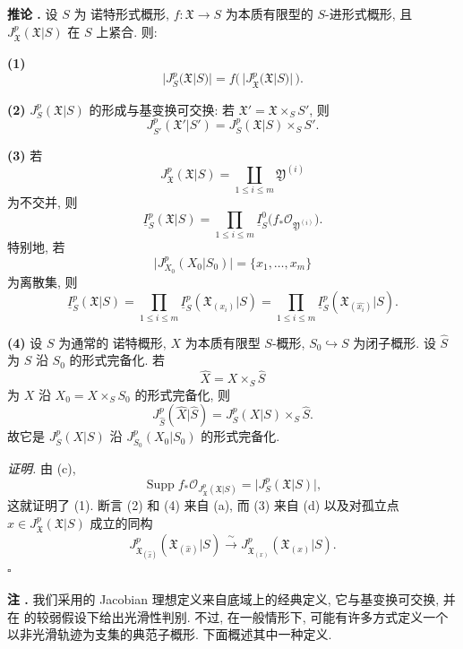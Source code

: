 \medskip
\noindent\textbf{推论 .}
设 $S$ 为 诺特形式概形, $f:\mathfrak X\longrightarrow S$ 为本质有限型的 $S$-进形式概形, 且 $J_{\mathfrak X}^p(\mathfrak X|S)$ 在 $S$ 上紧合. 则:

\smallskip
\noindent\textbf{(1)}
\[
\bigl|J_S^p(\mathfrak X|S)\bigr|
=f\bigl(\,|J_{\mathfrak X}^p(\mathfrak X|S)|\,\bigr).
\]


\smallskip
\noindent\textbf{(2)} $J_S^p(\mathfrak X|S)$ 的形成与基变换可交换: 若 $\mathfrak X'=\mathfrak X\times_SS'$, 则
\[
J_{S'}^p(\mathfrak X'|S')
=J_S^p(\mathfrak X|S)\times_SS'.
\]

\smallskip
\noindent\textbf{(3)} 若
\[
J_{\mathfrak X}^p(\mathfrak X|S)
=\coprod_{1\leq i\leq m}\mathfrak Y^{(i)}
\]
为不交并, 则
\[
\underline I_S^p(\mathfrak X|S)
=\prod_{1\leq i\leq m}
 \underline I_S^0\bigl(f_*\mathcal O_{\mathfrak Y^{(i)}}\bigr).
\]
特别地, 若
\[
\bigl|J_{X_0}^p(X_0|S_0)\bigr|=\{x_1,\ldots,x_m\}
\]
为离散集, 则
\[
\underline I_S^p(\mathfrak X|S)
=\prod_{1\leq i\leq m}
 \underline I_S^p(\mathfrak X_{(x_i)}|S)
=\prod_{1\leq i\leq m}
 \underline I_S^p(\mathfrak X_{(\widehat{x_i})}|S).
\]

\smallskip
\noindent\textbf{(4)} 设 $S$ 为通常的 诺特概形, $X$ 为本质有限型 $S$-概形, $S_0\hookrightarrow S$ 为闭子概形. 设 $\widehat S$ 为 $S$ 沿 $S_0$ 的形式完备化. 若
\[
\widehat X=X\times_S\widehat S
\]
为 $X$ 沿 $X_0=X\times_SS_0$ 的形式完备化, 则
\[
J_{\widehat S}^p(\widehat X|\widehat S)
=J_S^p(X|S)\times_S\widehat S.
\]
故它是 $J_S^p(X|S)$ 沿 $J_{S_0}^p(X_0|S_0)$ 的形式完备化.

\smallskip
\noindent\textit{证明.}
由 (c),
\[
\operatorname{Supp}
 f_*\mathcal O_{J_{\mathfrak X}^p(\mathfrak X|S)}
=\bigl|J_S^p(\mathfrak X|S)\bigr|,
\]
这就证明了 (1). 断言 (2) 和 (4) 来自 (a), 而 (3) 来自 (d) 以及对孤立点 $x\in J_{\mathfrak X}^p(\mathfrak X|S)$ 成立的同构
\[
J_{\mathfrak X_{(\widehat{x})}}^p
 (\mathfrak X_{(\widehat{x})}|S)
\xrightarrow{\ \sim\ }
J_{\mathfrak X_{(x)}}^p(\mathfrak X_{(x)}|S).
\]
\hfill$\square$

\medskip
\noindent\textbf{注 .}
我们采用的 Jacobian 理想定义来自底域上的经典定义, 它与基变换可交换, 并在  的较弱假设下给出光滑性判别. 不过, 在一般情形下, 可能有许多方式定义一个以非光滑轨迹为支集的典范子概形. 下面概述其中一种定义.

